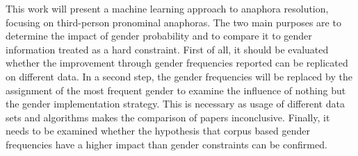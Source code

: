 This work will present a machine learning approach to anaphora resolution, focusing on third-person pronominal anaphoras. The two main purposes are to determine the impact of gender probability and to compare it to gender information treated as a hard constraint. First of all, it should be evaluated whether the improvement through gender frequencies  \cite{bergsma2005automatic} reported can be replicated on different data. In a second step, the gender frequencies will be replaced by the assignment of the most frequent gender to examine the influence of nothing but the gender implementation strategy. This is necessary as usage of different data sets and algorithms makes the comparison of papers inconclusive. Finally, it needs to be examined whether the hypothesis that corpus based gender frequencies have a higher impact than gender constraints can be confirmed.

